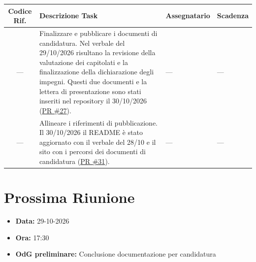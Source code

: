 \documentclass[a4paper, 11pt]{article}
\begin{document}
\begin{tabularx}{\textwidth}{|c|X|l|l|}
\hline
\textbf{Codice Rif.} & \textbf{Descrizione Task} & \textbf{Assegnatario} & \textbf{Scadenza} \\ \hline
--- & Finalizzare e pubblicare i documenti di candidatura. Nel verbale del 29/10/2026 risultano la revisione della valutazione dei capitolati e la finalizzazione della dichiarazione degli impegni. Questi due documenti e la lettera di presentazione sono stati inseriti nel repository il 30/10/2026 (\href{https://github.com/BitCrusher-Team/Progetto_SWE_26-27/pull/27}{PR \#27}). & --- & --- \\ \hline
--- & Allineare i riferimenti di pubblicazione. Il 30/10/2026 il README è stato aggiornato con il verbale del 28/10 e il sito con i percorsi dei documenti di candidatura (\href{https://github.com/BitCrusher-Team/Progetto_SWE_26-27/pull/31}{PR \#31}). & --- & --- \\ \hline
\end{tabularx}

\vspace{0.5cm}
\section{Prossima Riunione}
\begin{itemize}
    \item \textbf{Data:} 29-10-2026
    \item \textbf{Ora:} 17:30
    \item \textbf{OdG preliminare:} Conclusione documentazione per candidatura
\end{itemize}
\end{document}
